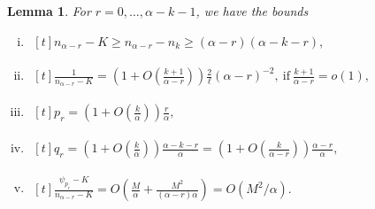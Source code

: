 \documentclass{article}
\theoremstyle{plain}
\theoremstyle{remark}
\theoremstyle{plain}
\newtheorem{lemma}[theorem]{Lemma}
\numberwithin{equation}{section}
\begin{document}
	\begin{lemma}\label{lemma_bounds2}
		For $r=0,\ldots,\alpha-k-1$, we have the bounds
		\begin{enumerate}[(i)]
			\item\label{lemma_bounds2_nrnk} $\begin{aligned}[t]
				n_{\alpha-r}-K\geq n_{\alpha-r}-n_k\geq(\alpha-r)(\alpha-k-r),
			\end{aligned}$
			\item\label{lemma_bounds2_nrk} $\begin{aligned}[t]
				\frac1{n_{\alpha-r}-K}=\left(1+O\left(\frac{k+1}{\alpha-r}\right)\right)\tfrac2{\ell}(\alpha-r)^{-2},\ \text{if}\ \frac{k+1}{\alpha-r}=o(1),
			\end{aligned}$
			\item\label{lemma_bounds2_pr} $\begin{aligned}[t]
				p_r=(1+O(\tfrac{k}{\alpha}))\tfrac{r}{\alpha},
			\end{aligned}$
			\item\label{lemma_bounds2_qr} $\begin{aligned}[t]
				q_r=(1+O(\tfrac{k}{\alpha}))\tfrac{\alpha-k-r}{\alpha}=(1+O(\tfrac{k}{\alpha-r}))\tfrac{\alpha-r}{\alpha},
			\end{aligned}$
			\item\label{lemma_bounds2_psipr} $\begin{aligned}[t]
				\frac{\psi_{p_r}-K}{n_{\alpha-r}-K}=O\left(\frac{M}{\alpha}+\frac{M^2}{(\alpha-r)\alpha}\right)=O(M^2/\alpha).
			\end{aligned}$
		\end{enumerate}
	\end{lemma}
	
\end{document}
